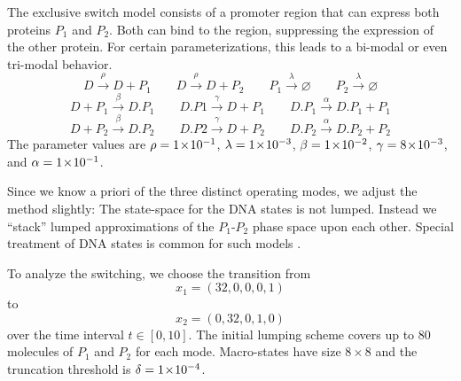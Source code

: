 \begin{model} The exclusive switch model consists of a promoter region
that can express both proteins $P_1$ and $P_2$. Both can bind to the region, suppressing
the expression of the other protein. For certain parameterizations, this leads to a
bi-modal or even tri-modal behavior.
$$ D \xrightarrow{\rho} D + P_1 \qquad D \xrightarrow{\rho} D + P_2 \qquad P_1 \xrightarrow{\lambda}\varnothing \qquad P_2 \xrightarrow{\lambda} \varnothing $$
$$ D + P_1 \xrightarrow{\beta} D.P_1 \qquad D.P1 \xrightarrow\gamma D + P_1 \qquad D.P_1 \xrightarrow\alpha D.P_1 + P_1 $$
$$ D + P_2 \xrightarrow{\beta} D.P_2 \qquad D.P2 \xrightarrow{\gamma} D + P_2 \qquad D.P_2 \xrightarrow\alpha D.P_2 + P_2 $$
The parameter values are $\rho= 1\!\times\!10^{-1} $, $\lambda= 1\!\times\!10^{-3} $, $\beta= 1\!\times\!10^{-2} $, $\gamma= 8\!\times\!10^{-3} $, and $\alpha= 1\!\times\!10^{-1} $.
\end{model}
Since we know a priori of the three distinct operating modes, we adjust
the method slightly:
The state-space for the \ac{DNA} states is not lumped. Instead we ``stack''
lumped approximations of the $P_1$-$P_2$ phase space upon each other. Special treatment of \ac{DNA} states is common for such models \cite{lapin2011shave}. 

To analyze the switching, we choose the transition from
\[
	x_{1} = (32, 0, 0, 0, 1) 
\]
to
\[
 x_2 = (0, 32, 0, 1, 0) 
\]
over the time interval $t\in[0,10]$.
The initial lumping scheme covers up to 80 molecules of $P_1$ and $P_2$ for each mode.
Macro-states have size $8\times8$ and
the truncation threshold is $\delta= 1\!\times\!10^{-4} $.

